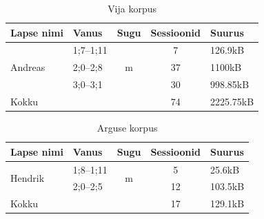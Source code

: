 \documentclass[12pt]{article}
\begin{document}
\begin{table}[H]
\centering
\caption{Vija korpus}
\begin{tabular}{|l|l|c|c|l|}
\hline
Lapse nimi               & Vanus     & Sugu               & Sessioonid & Suurus  \\ \hline\hline
\multirow{3}{*}{Andreas} & 1;7--1;11 & \multirow{3}{*}{m} & 7          & 126.9kB   \\ \cline{2-2} \cline{4-5} 
                         & 2;0--2;8  &                    & 37         & 1100kB    \\ \cline{2-2} \cline{4-5} 
                         & 3;0--3;1  &                    & 30         & 998.85kB  \\ \hline
Kokku                    & \multicolumn{2}{l|}{}          & 74         & 2225.75kB \\ \hline
\end{tabular}
\end{table}
\hfill

\begin{table}[H]
\centering
\caption{Arguse korpus}
\begin{tabular}{|l|l|c|c|l|}
\hline
Lapse nimi               & Vanus     & \multicolumn{1}{l|}{Sugu} & \multicolumn{1}{l|}{Sessioonid} & Suurus \\ \hline\hline
\multirow{2}{*}{Hendrik} & 1;8--1;11 & \multirow{2}{*}{m}        & 5                               & 25.6kB   \\ \cline{2-2} \cline{4-5} 
                         & 2;0--2;5  &                           & 12                              & 103.5kB  \\ \hline
Kokku                    & \multicolumn{2}{l|}{}                 & 17                              & 129.1kB  \\ \hline
\end{tabular}
\end{table}
\hfill
\end{document}
